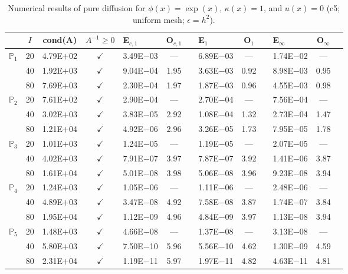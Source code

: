 \begin{table}[H]
\centering
\caption{Numerical results of pure diffusion for $\phi(x)=\exp(x)$, $\kappa(x)=1$, and $u(x)=0$ (c5; uniform mesh; $\epsilon=h^2$).}
\begin{tabular}{@{}l c c c l c c l c c l c c@{}}
\toprule
 & $I$ & cond(A) & $A^{-1}\geq 0$ &  E$_{c,1}$ & O$_{c,1}$ && E$_1$ & O$_1$ && E$_{\infty}$ & O$_{\infty}$\\
\midrule
\multirow{3}{*}{$\mathbb{P}_{1}$}
 & 20 & 4.79E$+$02 & $\checkmark$ & 3.49E$-$03 & --- && 6.89E$-$03 & --- && 1.74E$-$02 & ---\\
 & 40 & 1.92E$+$03 & $\checkmark$ & 9.04E$-$04 & 1.95 && 3.63E$-$03 & 0.92 && 8.98E$-$03 & 0.95\\
 & 80 & 7.69E$+$03 & $\checkmark$ & 2.30E$-$04 & 1.97 && 1.87E$-$03 & 0.96 && 4.55E$-$03 & 0.98\\
\midrule
\multirow{3}{*}{$\mathbb{P}_{2}$}
 & 20 & 7.61E$+$02 & $\checkmark$ & 2.90E$-$04 & --- && 2.70E$-$04 & --- && 7.56E$-$04 & ---\\
 & 40 & 3.02E$+$03 & $\checkmark$ & 3.83E$-$05 & 2.92 && 1.08E$-$04 & 1.32 && 2.73E$-$04 & 1.47\\
 & 80 & 1.21E$+$04 & $\checkmark$ & 4.92E$-$06 & 2.96 && 3.26E$-$05 & 1.73 && 7.95E$-$05 & 1.78\\
\midrule
\multirow{3}{*}{$\mathbb{P}_{3}$}
 & 20 & 1.01E$+$03 & $\checkmark$ & 1.24E$-$05 & --- && 1.19E$-$05 & --- && 2.07E$-$05 & ---\\
 & 40 & 4.02E$+$03 & $\checkmark$ & 7.91E$-$07 & 3.97 && 7.87E$-$07 & 3.92 && 1.41E$-$06 & 3.87\\
 & 80 & 1.61E$+$04 & $\checkmark$ & 5.01E$-$08 & 3.98 && 5.06E$-$08 & 3.96 && 9.23E$-$08 & 3.94\\
\midrule
\multirow{3}{*}{$\mathbb{P}_{4}$}
 & 20 & 1.24E$+$03 & $\checkmark$ & 1.05E$-$06 & --- && 1.11E$-$06 & --- && 2.48E$-$06 & ---\\
 & 40 & 4.89E$+$03 & $\checkmark$ & 3.47E$-$08 & 4.92 && 7.58E$-$08 & 3.87 && 1.74E$-$07 & 3.84\\
 & 80 & 1.95E$+$04 & $\checkmark$ & 1.12E$-$09 & 4.96 && 4.84E$-$09 & 3.97 && 1.13E$-$08 & 3.94\\
\midrule
\multirow{3}{*}{$\mathbb{P}_{5}$}
 & 20 & 1.48E$+$03 & $\checkmark$ & 4.66E$-$08 & --- && 1.37E$-$08 & --- && 3.13E$-$08 & ---\\
 & 40 & 5.80E$+$03 & $\checkmark$ & 7.50E$-$10 & 5.96 && 5.56E$-$10 & 4.62 && 1.30E$-$09 & 4.59\\
 & 80 & 2.31E$+$04 & $\checkmark$ & 1.19E$-$11 & 5.97 && 1.97E$-$11 & 4.82 && 4.63E$-$11 & 4.81\\
\bottomrule
\end{tabular}
\end{table}